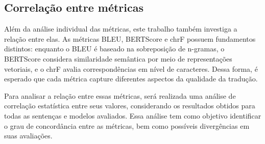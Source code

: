 \subsection{Correlação entre métricas}

Além da análise individual das métricas, este trabalho também investiga a relação entre elas. As métricas BLEU, BERTScore e chrF possuem fundamentos distintos: enquanto o BLEU é baseado na sobreposição de n-gramas, o BERTScore considera similaridade semântica por meio de representações vetoriais, e o chrF avalia correspondências em nível de caracteres. Dessa forma, é esperado que cada métrica capture diferentes aspectos da qualidade da tradução.

Para analisar a relação entre essas métricas, será realizada uma análise de correlação estatística entre seus valores, considerando os resultados obtidos para todas as sentenças e modelos avaliados. Essa análise tem como objetivo identificar o grau de concordância entre as métricas, bem como possíveis divergências em suas avaliações.




